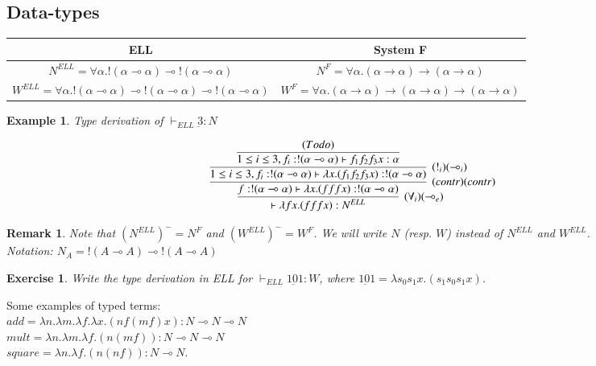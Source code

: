 \documentclass[a4paper,10pt]{article}
\newcommand{\impl}{\rightarrow}	%
\newcommand{\limpl}{\multimap}  %
\newtheorem{ex}{Example}
\newtheorem{exo}{Exercise}
\newtheorem{rmk}{Remark}
\begin{document}
\subsection{Data-types}

\begin{center}
\begin{tabular}{|c|c|}
\hline
ELL & System F \\
\hline
$N^{ELL} = \forall \alpha. !(\alpha \limpl \alpha) \limpl !(\alpha \limpl \alpha)$ & $N^{F} = \forall \alpha. (\alpha \impl \alpha) \impl (\alpha \impl \alpha)$\\
\hline
$W^{ELL} = \forall \alpha. !(\alpha \limpl \alpha) \limpl !(\alpha \limpl \alpha) \limpl !(\alpha \limpl \alpha)$ & $W^{F} = \forall \alpha. (\alpha \impl \alpha) \impl (\alpha \impl \alpha) \impl (\alpha \impl \alpha)$\\
\hline
\end{tabular}
\end{center}


\begin{ex}{Type derivation of $\vdash_{ELL} \underbar{3}:N$}

$$ \infer[(\forall_i) (\limpl_e)]{\vdash \lambda f x.(f f f x) : N^{ELL}}
	{
	\infer[(contr) (contr)]{f: !(\alpha \limpl \alpha) \vdash \lambda x.(f f f x) : !(\alpha \limpl \alpha)}
		{
		\infer[(!_i) (\limpl_i)]{1 \leq i \leq 3, f_i: !(\alpha \limpl \alpha) \vdash \lambda x. (f_1 f_2 f_3 x) : !(\alpha \limpl \alpha)}
			{
				\infer{1 \leq i \leq 3, f_i: !(\alpha \limpl \alpha) \vdash f_1 f_2 f_3 x : \alpha}
				{(To do)}
			}
		}
	}$$
\end{ex}

\begin{rmk}
Note that $(N^{ELL})^{-} = N^{F}$ and $(W^{ELL})^{-} = W^{F}$. We will write $N$ (resp. $W$) instead of $N^{ELL}$ and $W^{ELL}$.\\
Notation: $N_A = !(A \limpl A) \limpl !(A \limpl A)$
\end{rmk}

\begin{exo}
Write the type derivation in ELL for $\vdash_{ELL} \underbar{101} : W$, where $\underbar{101} = \lambda s_0 s_1 x. (s_1 s_0 s_1 x)$.
\end{exo}

 Some examples of typed terms:\\
$add = \lambda n. \lambda m. \lambda f. \lambda x. (n f (m f) x) : N \limpl N \limpl N$\\
$mult = \lambda n. \lambda m. \lambda f. (n (m f)) : N \limpl N \limpl N$\\
$square = \lambda n. \lambda f. (n (n f)) : N \limpl N$.
\end{document}
